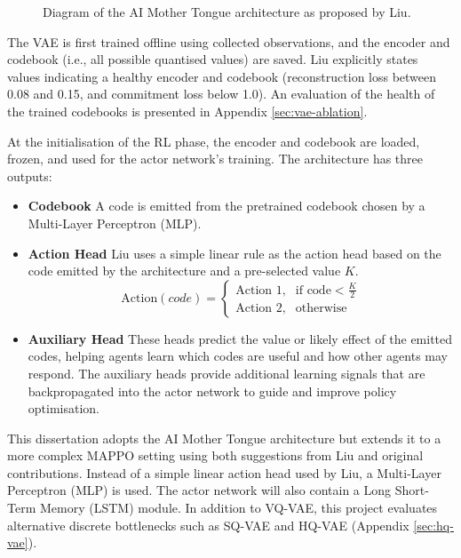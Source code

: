 \begin{figure}[htbp]
{
    }
    \caption{Diagram of the AI Mother Tongue architecture as proposed by Liu.}
    \label{fig:ai-mother-tongue}
\end{figure}

The VAE is first trained offline using collected observations, and the encoder and codebook (i.e., all possible quantised values) are saved.
Liu explicitly states values indicating a healthy encoder and codebook (reconstruction loss between 0.08 and 0.15, and commitment loss below 1.0).
An evaluation of the health of the trained codebooks is presented in Appendix \ref{sec:vae-ablation}.

At the initialisation of the RL phase, the encoder and codebook are loaded, frozen, and used for the actor network's training.
The architecture has three outputs:
\begin{itemize}
    \item \textbf{Codebook}
    A code is emitted from the pretrained codebook chosen by a Multi-Layer Perceptron (MLP).
    \item \textbf{Action Head}
    Liu uses a simple linear rule as the action head based on the code emitted by the architecture and a pre-selected value $K$.
    \begin{equation}
        \text{Action}(code) =
        \begin{cases}
            \text{Action 1}, & \text{if code} < \frac{K}{2} \\
            \text{Action 2}, & \text{otherwise}
        \end{cases}
    \end{equation}
    \item \textbf{Auxiliary Head}
    These heads predict the value or likely effect of the emitted codes, helping agents learn which codes are useful and how other agents may respond.
    The auxiliary heads provide additional learning signals that are backpropagated into the actor network to guide and improve policy optimisation.
\end{itemize}

This dissertation adopts the AI Mother Tongue architecture but extends it to a more complex MAPPO setting using both suggestions from Liu and original contributions.
Instead of a simple linear action head used by Liu, a Multi-Layer Perceptron (MLP) is used.
The actor network will also contain a Long Short-Term Memory (LSTM) module.
In addition to VQ-VAE, this project evaluates alternative discrete bottlenecks such as SQ-VAE and HQ-VAE (Appendix \ref{sec:hq-vae}).

